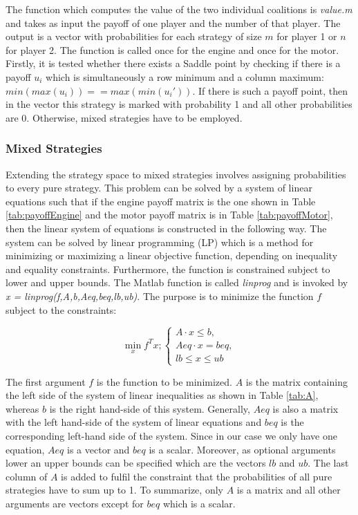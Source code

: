 The function which computes the value of the two individual coalitions is \textit{value.m} and takes as input the payoff of one player and the number of that player. The output is a vector with probabilities for each strategy of size $m$ for player 1 or $n$ for player 2. The function is called once for the engine and once for the motor. Firstly, it is tested whether there exists a Saddle point by checking if there is a payoff $u_i$ which is simultaneously a row minimum and a column maximum: $min(max(u_i)) == max(min(u_i'))$. If there is such a payoff point, then in the vector this strategy is marked with probability 1 and all other probabilities are 0. Otherwise, mixed strategies have to be employed. 

\subsubsection{Mixed Strategies}

Extending the strategy space to mixed strategies involves assigning probabilities to every pure strategy. This problem can be solved by a system of linear equations such that if the engine payoff matrix is the one shown in Table \ref{tab:payoffEngine} and the motor payoff matrix is in Table \ref{tab:payoffMotor}, then the linear system of equations is constructed in the following way. The system can be solved by linear programming (LP) which is a method for minimizing or maximizing a linear objective function, depending on inequality and equality constraints. Furthermore, the function is constrained subject to lower and upper bounds. The Matlab function is called \textit{linprog} and is invoked by \textit{x = linprog(f,A,b,Aeq,beq,lb,ub)}. The purpose is to minimize the function $f$ subject to the constraints:

\begin{equation}
\min_x f^Tx ; \left\{
                \begin{array}{ll}
                  A \cdot x \leq b,\\
                  Aeq \cdot x = beq,\\
                  lb \leq x \leq ub
                \end{array}
              \right.
\end{equation}

The first argument $f$ is the function to be minimized. $A$ is the matrix containing the left side of the system of linear inequalities as shown in Table \ref{tab:A}, whereas $b$ is the right hand-side of this system. Generally, $Aeq$ is also a matrix with the left hand-side of the system of linear equations and $beq$ is the corresponding left-hand side of the system. Since in our case we only have one equation, $Aeq$ is a vector and $beq$ is a scalar. Moreover, as optional arguments lower an upper bounds can be specified which are the vectors $lb$ and $ub$. The last column of $A$ is added to fulfil the constraint that the probabilities of all pure strategies have to sum up to 1. To summarize, only $A$ is a matrix and all other arguments are vectors except for $beq$ which is a scalar.


